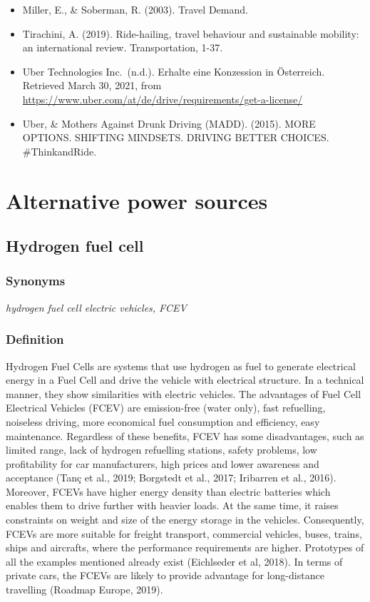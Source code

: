 \documentclass[
]{book}
\begin{document}
\begin{itemize}
\item
  Miller, E., \& Soberman, R. (2003). Travel Demand.
\item
  Tirachini, A. (2019). Ride-hailing, travel behaviour and sustainable mobility: an international review. Transportation, 1-37.
\item
  Uber Technologies Inc.~(n.d.). Erhalte eine Konzession in Österreich. Retrieved March 30, 2021, from \url{https://www.uber.com/at/de/drive/requirements/get-a-license/}
\item
  Uber, \& Mothers Against Drunk Driving (MADD). (2015). MORE OPTIONS. SHIFTING MINDSETS. DRIVING BETTER CHOICES. \#ThinkandRide.
\end{itemize}

\hypertarget{alternative}{%
\chapter{Alternative power sources}\label{alternative}}

\hypertarget{FCEV}{%
\section{Hydrogen fuel cell}\label{FCEV}}

\hypertarget{synonyms-43}{%
\subsection*{Synonyms}\label{synonyms-43}}

\emph{hydrogen fuel cell electric vehicles, FCEV}

\hypertarget{definition-46}{%
\subsection*{Definition}\label{definition-46}}

Hydrogen Fuel Cells are systems that use hydrogen as fuel to generate electrical energy in a Fuel Cell and drive the vehicle with electrical structure. In a technical manner, they show similarities with electric vehicles. The advantages of Fuel Cell Electrical Vehicles (FCEV) are emission-free (water only), fast refuelling, noiseless driving, more economical fuel consumption and efficiency, easy maintenance. Regardless of these benefits, FCEV has some disadvantages, such as limited range, lack of hydrogen refuelling stations, safety problems, low profitability for car manufacturers, high prices and lower awareness and acceptance (Tanç et al., 2019; Borgstedt et al., 2017; Iribarren et al., 2016). Moreover, FCEVs have higher energy density than electric batteries which enables them to drive further with heavier loads. At the same time, it raises constraints on weight and size of the energy storage in the vehicles. Consequently, FCEVs are more suitable for freight transport, commercial vehicles, buses, trains, ships and aircrafts, where the performance requirements are higher. Prototypes of all the examples mentioned already exist (Eichlseder et al, 2018). In terms of private cars, the FCEVs are likely to provide advantage for long-distance travelling (Roadmap Europe, 2019).
\end{document}
